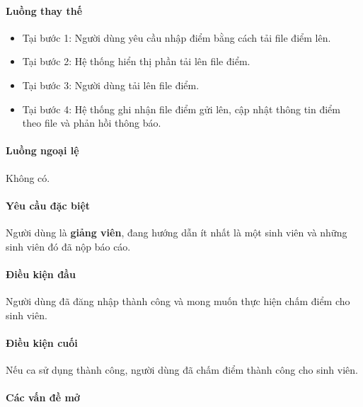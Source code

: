 \documentclass[./../main.tex]{subfiles}
\begin{document}
\paragraph*{Luồng thay thế}

\begin{itemize}
  \item
    
  Tại bước 1: Người dùng yêu cầu nhập điểm bằng cách tải file điểm lên.
    
  \item
    
  Tại bước 2:  Hệ thống hiển thị phần tải lên file điểm.
    
  \item
    
  Tại bước 3: Người dùng tải lên file điểm.
    
  \item
    
  Tại bước 4: Hệ thống ghi nhận file điểm gửi lên, cập nhật thông tin điểm theo file và phản hồi thông báo.

\end{itemize}

\paragraph*{Luồng ngoại lệ} Không có.

\paragraph*{Yêu cầu đặc biệt}

Người dùng là \textbf{giảng viên}, đang hướng dẫn ít nhất là một sinh viên và những sinh viên đó đã nộp báo cáo.

\paragraph*{Điều kiện đầu}

Người dùng đã đăng nhập thành công và mong muốn thực hiện chấm điểm cho sinh viên.

\paragraph*{Điều kiện cuối}

Nếu ca sử dụng thành công, người dùng đã chấm điểm thành công cho sinh viên.

\paragraph*{Các vấn đề mở}
\end{document}
